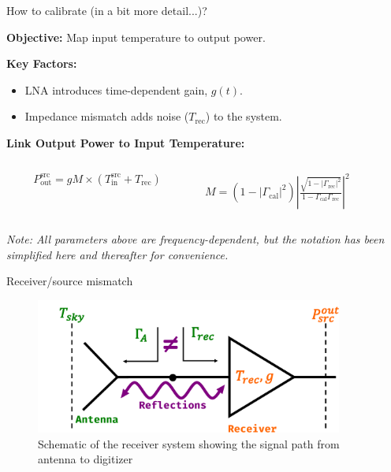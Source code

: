 \documentclass[aspectratio=169]{beamer}
\begin{document}
\begin{frame}{\small{How to calibrate (in a bit more detail...)?}}
	\vspace{-0.5cm}
	\begin{flushleft}
		\textbf{Objective:} Map input temperature to output power.
		\vspace{0.2cm}

		\textbf{Key Factors:}
		\begin{itemize}
			\item LNA introduces time-dependent gain, $g(t)$.
			\item Impedance mismatch adds noise ($T_{\text{rec}}$) to the system.
		\end{itemize}

		\vspace{0.2cm}
		\textbf{Link Output Power to Input Temperature:}
	\end{flushleft}

	\begin{columns}
		\begin{column}{0.5\textwidth}
			{
				\begin{equation}
					P_{\text{out}}^{\text{src}} = g M \times \left( T_{\text{in}}^{\text{src}} + T_{\text{rec}} \right)
				\end{equation}
			}

		\end{column}
		\begin{column}{0.3\textwidth}

			\small $M = \left( 1 - |\Gamma_{\text{cal}}|^2 \right) | \frac{\sqrt{1 - |\Gamma_{\text{rec}}|^2}}{1 - \Gamma_{\text{cal}} \Gamma_{\text{rec}}}|^2$
		\end{column}
	\end{columns}

	\vfill

	\begin{footnotesize}
		\textit{Note: All parameters above are frequency-dependent, but the notation has been simplified here and thereafter for convenience.}
	\end{footnotesize}

\end{frame}

\begin{frame}{\small{Receiver/source mismatch}}
	\begin{figure}[h]
		\centering
		\includegraphics[width=0.9\textwidth]{images/intro_receiver.pdf}
		\caption{Schematic of the receiver system showing the signal path from antenna to digitizer}
	\end{figure}
\end{frame}
\end{document}
